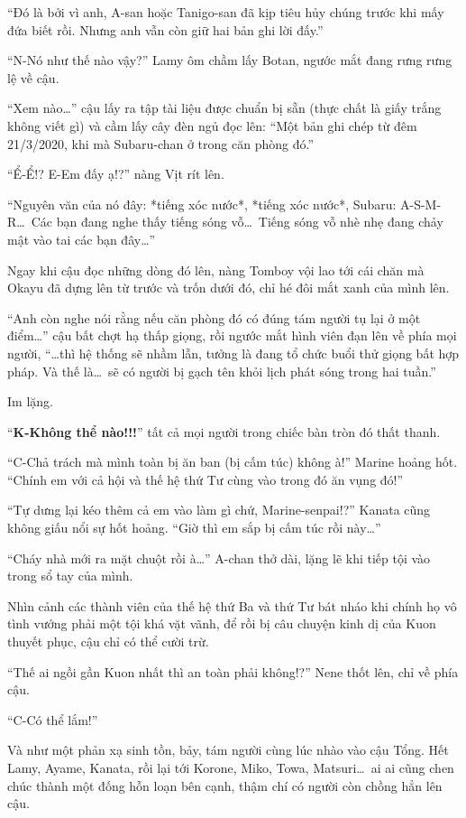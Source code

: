 \documentclass[../main.tex]{subfiles}
\begin{document}
``Đó là bởi vì anh, A-san hoặc Tanigo-san đã kịp tiêu hủy chúng trước khi mấy đứa biết rồi. Nhưng anh vẫn còn giữ hai bản ghi lời đấy.''

``N-Nó như thế nào vậy?'' Lamy ôm chầm lấy Botan, ngước mắt đang rưng rưng lệ về cậu.

``Xem nào\dots'' cậu lấy ra tập tài liệu được chuẩn bị sẵn (thực chất là giấy trắng không viết gì) và cầm lấy cây đèn ngủ đọc lên: ``Một bản ghi chép từ đêm 21/3/2020, khi mà Subaru-chan ở trong căn phòng đó.''

``Ể-Ể!? E-Em đấy ạ!?'' nàng Vịt rít lên.

``Nguyên văn của nó đây: *tiếng xóc nước*, *tiếng xóc nước*, Subaru: A-S-M-R\dots\ Các bạn đang nghe thấy tiếng sóng vỗ\dots\ Tiếng sóng vỗ nhè nhẹ đang chảy mật vào tai các bạn đây\dots''

Ngay khi cậu đọc những dòng đó lên, nàng Tomboy vội lao tới cái chăn mà Okayu đã dựng lên từ trước và trốn dưới đó, chỉ hé đôi mắt xanh của mình lên.

``Anh còn nghe nói rằng nếu căn phòng đó có đúng tám người tụ lại ở một điểm\dots'' cậu bất chợt hạ thấp giọng, rồi ngước mắt hình viên đạn lên về phía mọi người, ``\dots thì hệ thống sẽ nhầm lẫn, tưởng là đang tổ chức buổi thử giọng bất hợp pháp. Và thế là\dots\ sẽ có người bị gạch tên khỏi lịch phát sóng trong hai tuần.''

Im lặng.

``\textbf{K-Không thể nào!!!}'' tất cả mọi người trong chiếc bàn tròn đó thất thanh.

``C-Chả trách mà mình toàn bị ăn ban (bị cấm túc) không à!'' Marine hoảng hốt. ``Chính em với cả hội và thế hệ thứ Tư cùng vào trong đó ăn vụng đó!''

``Tự dưng lại kéo thêm cả em vào làm gì chứ, Marine-senpai!?'' Kanata cũng không giấu nổi sự hốt hoảng. ``Giờ thì em sắp bị cấm túc rồi này\dots''

``Cháy nhà mới ra mặt chuột rồi à\dots'' A-chan thở dài, lặng lẽ khi tiếp tội vào trong sổ tay của mình.

Nhìn cảnh các thành viên của thế hệ thứ Ba và thứ Tư bát nháo khi chính họ vô tình vướng phải một tội khá vặt vãnh, để rồi bị câu chuyện kinh dị của Kuon thuyết phục, cậu chỉ có thể cười trừ.

``Thế ai ngồi gần Kuon nhất thì an toàn phải không!?'' Nene thốt lên, chỉ về phía cậu.

``C-Có thể lắm!''

Và như một phản xạ sinh tồn, bảy, tám người cùng lúc nhào vào cậu Tổng. Hết Lamy, Ayame, Kanata, rồi lại tới Korone, Miko, Towa, Matsuri\dots\ ai ai cũng chen chúc thành một đống hỗn loạn bên cạnh, thậm chí có người còn chồng hẳn lên cậu.
\end{document}
